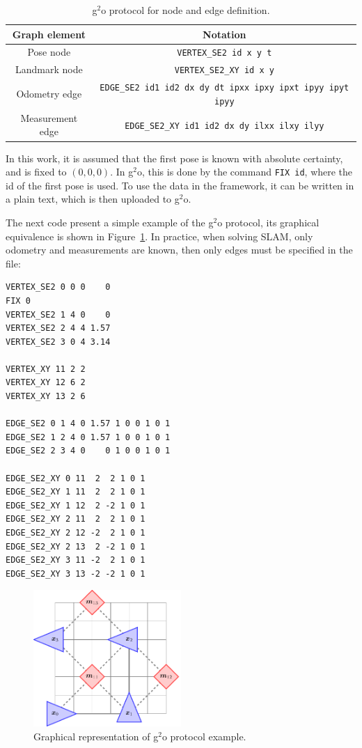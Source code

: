 \begin{table}[htbp!]
    \centering
    \begin{tabular}{|c|c|}
        \hline
        Graph element & Notation\\
        \hline
        Pose node & \texttt{VERTEX\_SE2 id x y t}\\
        Landmark node & \texttt{VERTEX\_SE2\_XY id x y}\\
        Odometry edge & \texttt{EDGE\_SE2 id1 id2 dx dy dt ipxx ipxy ipxt ipyy ipyt ipyy}\\
        Measurement edge & \texttt{EDGE\_SE2\_XY id1 id2 dx dy ilxx ilxy ilyy}\\
        \hline
    \end{tabular}
    \caption{g$^2$o protocol for node and edge definition.}
    \label{tab:protocol}
\end{table}

In this work, it is assumed that the first pose is known with absolute certainty, and is fixed to $(0,0,0)$. In g$^2$o, this is done by the command \texttt{FIX id}, where the id of the first pose is used. To use the data in the framework, it can be written in a plain text, which is then uploaded to g$^2$o.

The next code present a simple example of the g$^2$o protocol, its graphical equivalence is shown in Figure~\ref{fig:protocol-example}. In practice, when solving SLAM, only odometry and measurements are known, then only edges must be specified in the file:
 
\begin{lstlisting}[caption = g$^2$o protocol example, captionpos=b, basicstyle=\small]
VERTEX_SE2 0 0 0    0
FIX 0
VERTEX_SE2 1 4 0    0
VERTEX_SE2 2 4 4 1.57
VERTEX_SE2 3 0 4 3.14

VERTEX_XY 11 2 2
VERTEX_XY 12 6 2
VERTEX_XY 13 2 6

EDGE_SE2 0 1 4 0 1.57 1 0 0 1 0 1
EDGE_SE2 1 2 4 0 1.57 1 0 0 1 0 1
EDGE_SE2 2 3 4 0    0 1 0 0 1 0 1

EDGE_SE2_XY 0 11  2  2 1 0 1
EDGE_SE2_XY 1 11  2  2 1 0 1
EDGE_SE2_XY 1 12  2 -2 1 0 1
EDGE_SE2_XY 2 11  2  2 1 0 1
EDGE_SE2_XY 2 12 -2  2 1 0 1
EDGE_SE2_XY 2 13  2 -2 1 0 1
EDGE_SE2_XY 3 11 -2  2 1 0 1
EDGE_SE2_XY 3 13 -2 -2 1 0 1
\end{lstlisting}

\begin{figure}[htbp!]
    \centering
    \includegraphics[width=0.5\textwidth]{tikz/protocol-example.pdf}
    \caption{Graphical representation of g$^2$o protocol example.}
    \label{fig:protocol-example}
\end{figure}

